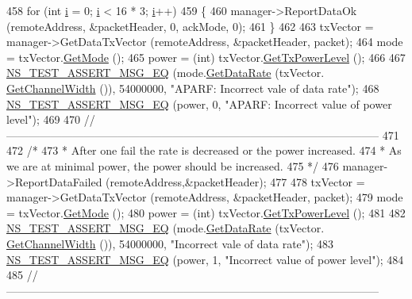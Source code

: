 \begin{DoxyCode}
458   \textcolor{keywordflow}{for} (\textcolor{keywordtype}{int} \hyperlink{bernuolliDistribution_8m_a6f6ccfcf58b31cb6412107d9d5281426}{i} = 0; \hyperlink{bernuolliDistribution_8m_a6f6ccfcf58b31cb6412107d9d5281426}{i} < 16 * 3; \hyperlink{bernuolliDistribution_8m_a6f6ccfcf58b31cb6412107d9d5281426}{i}++)
459     \{
460       manager->ReportDataOk (remoteAddress, &packetHeader, 0, ackMode, 0);
461     \}
462 
463   txVector = manager->GetDataTxVector (remoteAddress, &packetHeader, packet);
464   mode = txVector.\hyperlink{classns3_1_1WifiTxVector_a497b1f11cad4b8b26251dfa07c9ad1d6}{GetMode} ();
465   power = (int) txVector.\hyperlink{classns3_1_1WifiTxVector_a7c98bd9609ff1c5cefa6e22d6908a2fe}{GetTxPowerLevel} ();
466 
467   \hyperlink{group__testing_ga2a9d78cffb3db8e867c35fff0b698cf5}{NS\_TEST\_ASSERT\_MSG\_EQ} (mode.\hyperlink{classns3_1_1WifiMode_adcfbe150f69da720db23387f733b8a52}{GetDataRate} (txVector.
      \hyperlink{classns3_1_1WifiTxVector_a1f8bfa51778a3e217581eb665f059564}{GetChannelWidth} ()), 54000000, \textcolor{stringliteral}{"APARF: Incorrect vale of data rate"});
468   \hyperlink{group__testing_ga2a9d78cffb3db8e867c35fff0b698cf5}{NS\_TEST\_ASSERT\_MSG\_EQ} (power, 0, \textcolor{stringliteral}{"APARF: Incorrect value of power level"});
469 
470   \textcolor{comment}{//-----------------------------------------------------------------------------------------------------}
471 
472   \textcolor{comment}{/*}
473 \textcolor{comment}{   * After one fail the rate is decreased or the power increased.}
474 \textcolor{comment}{   * As we are at minimal power, the power should be increased.}
475 \textcolor{comment}{   */}
476   manager->ReportDataFailed (remoteAddress,&packetHeader);
477 
478   txVector = manager->GetDataTxVector (remoteAddress, &packetHeader, packet);
479   mode = txVector.\hyperlink{classns3_1_1WifiTxVector_a497b1f11cad4b8b26251dfa07c9ad1d6}{GetMode} ();
480   power = (int) txVector.\hyperlink{classns3_1_1WifiTxVector_a7c98bd9609ff1c5cefa6e22d6908a2fe}{GetTxPowerLevel} ();
481 
482   \hyperlink{group__testing_ga2a9d78cffb3db8e867c35fff0b698cf5}{NS\_TEST\_ASSERT\_MSG\_EQ} (mode.\hyperlink{classns3_1_1WifiMode_adcfbe150f69da720db23387f733b8a52}{GetDataRate} (txVector.
      \hyperlink{classns3_1_1WifiTxVector_a1f8bfa51778a3e217581eb665f059564}{GetChannelWidth} ()), 54000000, \textcolor{stringliteral}{"Incorrect vale of data rate"});
483   \hyperlink{group__testing_ga2a9d78cffb3db8e867c35fff0b698cf5}{NS\_TEST\_ASSERT\_MSG\_EQ} (power, 1, \textcolor{stringliteral}{"Incorrect value of power level"});
484 
485   \textcolor{comment}{//-----------------------------------------------------------------------------------------------------}

\end{DoxyCode}
